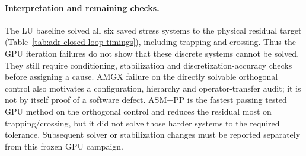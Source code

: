 \paragraph{Interpretation and remaining checks.}
The LU baseline solved all six saved stress systems
to the physical residual target (Table~\ref{tab:adr-closed-loop-timings}),
including trapping and crossing. Thus the GPU iteration failures do not
show that these discrete systems cannot be solved. They still require
conditioning, stabilization and discretization-accuracy checks before
assigning a cause. AMGX failure on the directly solvable orthogonal
control also motivates a configuration, hierarchy and operator-transfer
audit; it is not by itself proof of a software defect. ASM+PP is the
fastest passing tested GPU method on the orthogonal control and reduces
the residual most on trapping/crossing, but it did not solve those harder
systems to the required tolerance. Subsequent solver or stabilization
changes must be reported separately from this frozen GPU campaign.

